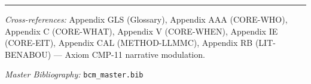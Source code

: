 \nocite{bcm_master}


\vspace{1em}
\hrule
\vspace{0.5em}

\noindent\textit{Cross-references:}
Appendix GLS (Glossary),
Appendix AAA (CORE-WHO),
Appendix C (CORE-WHAT),
Appendix V (CORE-WHEN),
Appendix IE (CORE-EIT),
Appendix CAL (METHOD-LLMMC),
Appendix RB (LIT-BENABOU) --- Axiom CMP-11 narrative modulation.

\noindent\textit{Master Bibliography:} \texttt{bcm\_master.bib}

